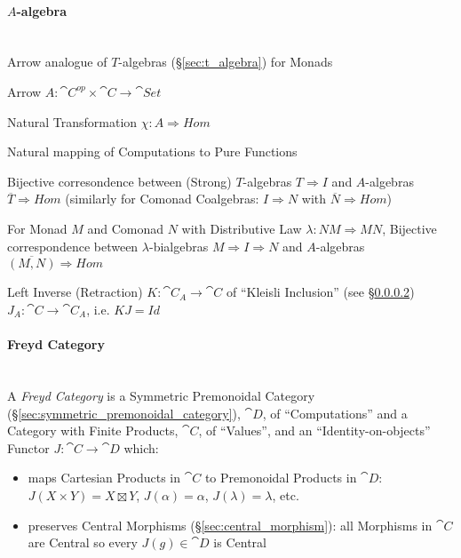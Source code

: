 \paragraph{$A$-algebra}\label{sec:a_algebra}
\cite{jacobs-heunen-hasuo09}
\hfill \\

Arrow analogue of $T$-algebras (\S\ref{sec:t_algebra}) for Monads

Arrow $A : \cat{C}^{op} \times \cat{C} \rightarrow \cat{Set}$

Natural Transformation $\chi : A \Rightarrow Hom$

Natural mapping of Computations to Pure Functions

Bijective corresondence between (Strong) $T$-algebras $T \Rightarrow
I$ and $A$-algebras $\overline{T} \Rightarrow Hom$ (similarly for
Comonad Coalgebras: $I \Rightarrow N$ with $\overline{N} \Rightarrow
Hom$)

For Monad $M$ and Comonad $N$ with Distributive Law $\lambda : N M
\Rightarrow M N$, Bijective correspondence between
$\lambda$-bialgebras $M \Rightarrow I \Rightarrow N$ and $A$-algebras
$\overline{(M,N)} \Rightarrow Hom$

Left Inverse (Retraction) $K : \cat{C}_A \rightarrow \cat{C}$ of
``Kleisli Inclusion'' (see \S\ref{sec:freyd_category}) $J_A : \cat{C}
\rightarrow \cat{C}_A$, i.e. $K J = Id$



\paragraph{Freyd Category}\label{sec:freyd_category}
\hfill \\

A \emph{Freyd Category} is a Symmetric Premonoidal Category
(\S\ref{sec:symmetric_premonoidal_category}), $\cat{D}$, of
``Computations'' and a Category with Finite Products, $\cat{C}$, of
``Values'', and an ``Identity-on-objects'' Functor $J : \cat{C}
\rightarrow \cat{D}$ which:
\begin{itemize}
\item maps Cartesian Products in $\cat{C}$ to Premonoidal Products in
  $\cat{D}$: $J(X \times Y) = X \boxtimes Y$, $J(\alpha) = \alpha$,
  $J(\lambda) = \lambda$, etc.
\item preserves Central Morphisms (\S\ref{sec:central_morphism}): all
  Morphisms in $\cat{C}$ are Central so every $J(g) \in \cat{D}$ is
  Central
\end{itemize}
\cite{jacobs-heunen-hasuo09}

